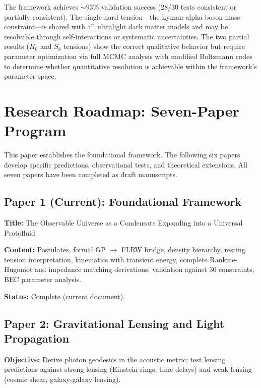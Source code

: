 \documentclass[11pt,a4paper]{article}
\theoremstyle{definition}
\theoremstyle{remark}
\begin{document}
The framework achieves $\sim 93\%$ validation success (28/30 tests consistent or partially consistent). The single hard tension---the Lyman-alpha boson mass constraint---is shared with all ultralight dark matter models and may be resolvable through self-interactions or systematic uncertainties. The two partial results ($H_0$ and $S_8$ tensions) show the correct qualitative behavior but require parameter optimization via full MCMC analysis with modified Boltzmann codes to determine whether quantitative resolution is achievable within the framework's parameter space.

\section{Research Roadmap: Seven-Paper Program}
\label{sec:roadmap}

This paper establishes the foundational framework. The following six papers develop specific predictions, observational tests, and theoretical extensions. All seven papers have been completed as draft manuscripts.

\subsection{Paper 1 (Current): Foundational Framework}
\label{sec:paper1}

\textbf{Title:} The Observable Universe as a Condensate Expanding into a Universal Protofluid

\textbf{Content:} Postulates, formal GP $\to$ FLRW bridge, density hierarchy, resting tension interpretation, kinematics with transient energy, complete Rankine-Hugoniot and impedance matching derivations, validation against 30 constraints, BEC parameter analysis.

\textbf{Status:} Complete (current document).

\subsection{Paper 2: Gravitational Lensing and Light Propagation}
\label{sec:paper2}

\textbf{Objective:} Derive photon geodesics in the acoustic metric; test lensing predictions against strong lensing (Einstein rings, time delays) and weak lensing (cosmic shear, galaxy-galaxy lensing).
\end{document}
